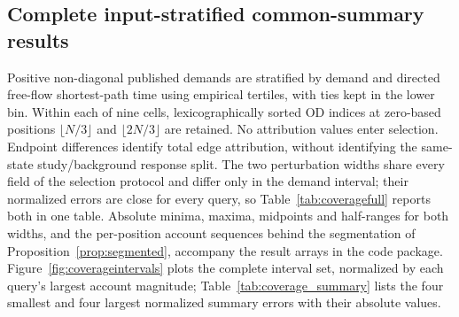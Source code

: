 \subsection{Complete input-stratified common-summary results}\label{sec:coverage}
Positive non-diagonal published demands are stratified by demand and directed free-flow shortest-path time using empirical tertiles, with ties kept in the lower bin. Within each of nine cells, lexicographically sorted OD indices at zero-based positions $\lfloor N/3\rfloor$ and $\lfloor2N/3\rfloor$ are retained. No attribution values enter selection. Endpoint differences identify total edge attribution, without identifying the same-state study/background response split. The two perturbation widths share every field of the selection protocol and differ only in the demand interval; their normalized errors are close for every query, so Table~\ref{tab:coveragefull} reports both in one table. Absolute minima, maxima, midpoints and half-ranges for both widths, and the per-position account sequences behind the segmentation of Proposition~\ref{prop:segmented}, accompany the result arrays in the code package. Figure~\ref{fig:coverageintervals} plots the complete interval set, normalized by each query's largest account magnitude; Table~\ref{tab:coverage_summary} lists the four smallest and four largest normalized summary errors with their absolute values.
